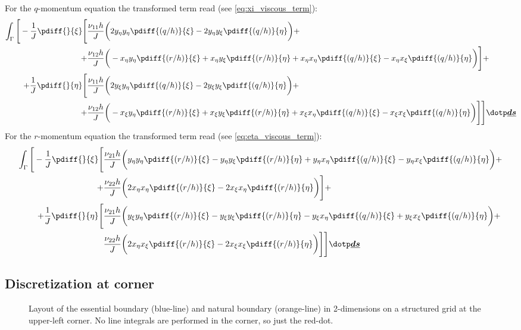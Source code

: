 For the $q$-momentum equation the transformed term read (see \autoref{eq:xi_viscous_term}):
\begin{align}
\int_\Gamma \Bigg[
%
- \frac{1}{J} \pdiff{}{\xi}\Bigg[ &  \frac{\nu_{11} h}{J} \bigg(
2 y_{\eta}  y_{\eta} \pdiff{(q/h)}{\xi}
- 2 y_{\eta} y_{\xi} \pdiff{(q/h)}{\eta} \bigg)
+
\\
+ &
\frac{\nu_{12} h}{J} \bigg(
- x_{\eta}y_{\eta} \pdiff{(r/h)}{\xi}
+ x_{\eta}y_{\xi} \pdiff{(r/h)}{\eta}
+ x_{\eta}x_{\eta}\pdiff{(q/h)}{\xi}
- x_{\eta}x_{\xi}\pdiff{(q/h)}{\eta} \bigg) \Bigg] +
\\
+ \frac{1}{J} \pdiff{}{\eta}\Bigg[& \frac{\nu_{11} h}{J} \bigg(
2 y_{\xi}y_{\eta} \pdiff{(q/h)}{\xi}
- 2 y_{\xi}y_{\xi} \pdiff{(q/h)}{\eta} \bigg) +
\\
+ &
\frac{\nu_{12} h}{J} \bigg(
- x_{\xi}y_{\eta} \pdiff{(r/h)}{\xi}
+ x_{\xi}y_{\xi} \pdiff{(r/h)}{\eta}
+ x_{\xi} x_{\eta} \pdiff{(q/h)}{\xi}
- x_{\xi}x_{\xi} \pdiff{(q/h)}{\eta} \bigg) \Bigg]
%
\Bigg] \dotp \vec{ds}
\end{align}
For the $r$-momentum equation the transformed term read (see \autoref{eq:eta_viscous_term}):
\begin{align}
\int_\Gamma \Bigg[
%
- \frac{1}{J} \pdiff{}{\xi} \Bigg[\frac{\nu_{21} h}{J} &\bigg( y_{\eta}y_{\eta}  \pdiff{(r/h)}{\xi} - y_{\eta} y_{\xi} \pdiff{(r/h)}{\eta} + y_{\eta} x_{\eta} \pdiff{(q/h)}{\xi} - y_{\eta} x_{\xi} \pdiff{(q/h)}{\eta}
\bigg) +
\\
+ \frac{\nu_{22} h}{J} & \bigg(
2 x_{\eta}x_{\eta} \pdiff{(r/h)}{\xi} - 2 x_{\xi} x_{\eta} \pdiff{(r/h)}{\eta} \bigg) \Bigg]
+
\\
+ \frac{1}{J} \pdiff{}{\eta} \Bigg[\frac{\nu_{21} h}{J} & \bigg(
y_{\xi} y_{\eta} \pdiff{(r/h)}{\xi}
- y_{\xi} y_{\xi} \pdiff{(r/h)}{\eta}
- y_{\xi} x_{\eta} \pdiff{(q/h)}{\xi}
+ y_{\xi} x_{\xi} \pdiff{(q/h)}{\eta}
\bigg) +
\\
\frac{\nu_{22} h}{J} & \bigg( 2 x_{\eta}x_{\xi} \pdiff{(r/h)}{\xi} - 2 x_{\xi}x_{\xi} \pdiff{(r/h)}{\eta} \bigg) \Bigg]
%
\Bigg] \dotp \vec{ds}
\end{align}
\notyet
\subsection{Discretization at corner}
\begin{figure}[H]
    \begin{center}
        \def\svgwidth{0.8\textwidth} %
        \resizebox{0.65\textwidth}{!}{
            
        }
    \end{center}
    \caption{Layout of the essential boundary (blue-line) and natural boundary (orange-line) in 2-dimensions on a structured grid at the upper-left corner. No line integrals are performed in the corner, so just the red-dot.}
    \label{fig:structured_grid_at_corner}
\end{figure}

